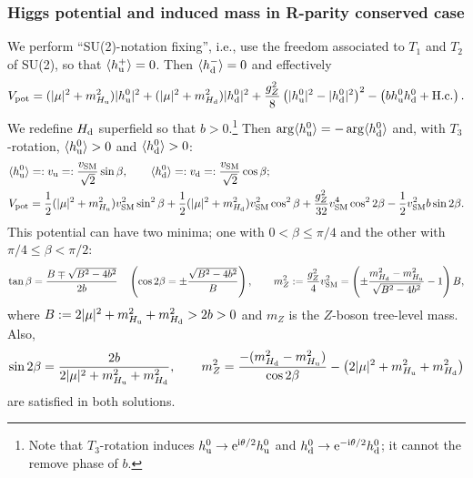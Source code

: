 \documentclass[CheatSheet]{subfiles}
\begin{document}
\subsubsection{Higgs potential and induced mass in  R-parity conserved case}
We perform ``SU(2)-notation fixing'', i.e., use the freedom associated to $T_1$ and $T_2$ of SU(2), so that $\langle h_{\mathrm{u}}^+\rangle=0$. Then $\langle h_{\mathrm{d}}^-\rangle=0$ and effectively
\begin{equation}
 V_{\mathrm{pot}}=
   (|\mu|^2 + m^2_{H_{\mathrm{u}}})  |h_{\mathrm{u}}^0|^2
 + (|\mu|^2 + m^2_{H_{\mathrm{d}}}) |h_{\mathrm{d}}^0|^2
 + \frac{g_Z^2}{8}\left(|h_{\mathrm{u}}^0|^2 - |h_{\mathrm{d}}^0|^2\right)^2
 - \left(bh_{\mathrm{u}}^0h_{\mathrm{d}}^0 +\text{H.c.}\right).
\end{equation}
We redefine $H_{\mathrm{d}}$ superfield so that $b>0$.\footnote{%
Note that $T_3$-rotation induces $h_{\mathrm{u}}^0\to\mathop{}\!\mathrm{e}^{\mathrm{i}\theta/2}h_{\mathrm{u}}^0$ and $h_{\mathrm{d}}^0\to\mathop{}\!\mathrm{e}^{-\mathrm{i}\theta/2}h_{\mathrm{d}}^0$; it cannot the remove phase of $b$.}
Then $\arg\langle h_{\mathrm{u}}^0\rangle=-\arg\langle h_{\mathrm{d}}^0\rangle$ and, with $T_3$-rotation, $\langle h_{\mathrm{u}}^0\rangle>0$ and $\langle h_{\mathrm{d}}^0\rangle>0$:
\begin{align}
 &\langle h_{\mathrm{u}}^0\rangle =: v_{\mathrm{u}} =: \frac{v_{\mathrm{SM}}}{\sqrt2}\sin\beta,\qquad
 \langle h_{\mathrm{d}}^0\rangle =: v_{\mathrm{d}} =: \frac{v_{\mathrm{SM}}}{\sqrt2}\cos\beta;
\\& V_{\mathrm{pot}}=
   \frac12(|\mu|^2 + m^2_{H_{\mathrm{u}}})  v_{\mathrm{SM}}^2\sin^2\beta
 + \frac12(|\mu|^2 + m^2_{H_{\mathrm{d}}}) v_{\mathrm{SM}}^2\cos^2\beta
 + \frac{g_Z^2}{32}v_{\mathrm{SM}}^4\cos^2 2\beta
 - \frac12 v_{\mathrm{SM}}^2 b\sin2\beta.
\end{align}
This potential can have two minima; one with $0<\beta\le\pi/4$ and the other with $\pi/4\le\beta<\pi/2$:
\begin{equation}
 \tan\beta = \frac{B\mp\sqrt{B^2-4b^2}}{2b}
\quad
\left(\cos2\beta = \pm\frac{\sqrt{B^2-4b^2}}{B}\right),
 \qquad
 m_Z^2:=\frac{g_Z^2}{4}v_{\mathrm{SM}}^2 = \left(\pm\frac{m_{H_{\mathrm{d}}}^2 - m_{H_{\mathrm{u}}}^2}{\sqrt{B^2-4b^2}}-1\right)B,
\end{equation}
where $B:=2|\mu|^2+m_{H_{\mathrm{u}}}^2+m_{H_{\mathrm{d}}}^2>2b>0$ and $m_Z$ is the $Z$-boson tree-level mass.
Also,
\begin{equation}
 \sin2\beta = \frac{2b}{2|\mu|^2 + m_{H_{\mathrm{u}}}^2 + m_{H_{\mathrm{d}}}^2},
\qquad
 m_Z^2 = \frac{-(m_{H_{\mathrm{d}}}^2 - m_{H_{\mathrm{u}}}^2)}{\cos2\beta} - \left(2|\mu|^2 + m_{H_{\mathrm{u}}}^2 + m_{H_{\mathrm{d}}}^2\right)
\end{equation}
are satisfied in both solutions.
\end{document}
